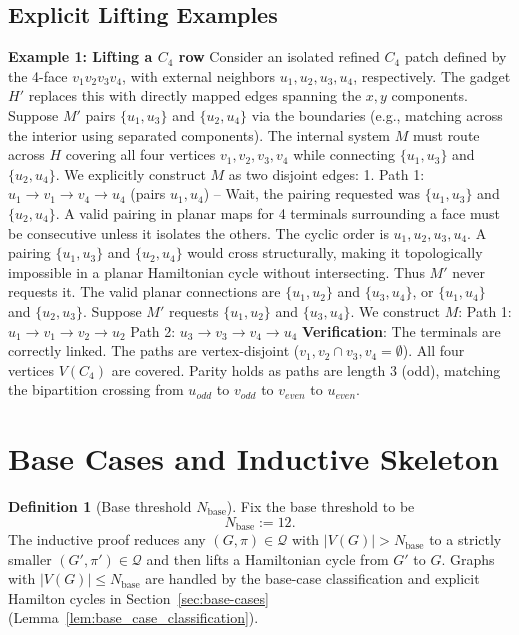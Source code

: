 \documentclass[12pt]{article}
\theoremstyle{definition}
\newtheorem{definition}[theorem]{Definition}
\begin{document}
\subsection{Explicit Lifting Examples}

\textbf{Example 1: Lifting a $C_4$ row}
Consider an isolated refined $C_4$ patch defined by the 4-face $v_1v_2v_3v_4$, with external neighbors $u_1, u_2, u_3, u_4$, respectively. The gadget $H'$ replaces this with directly mapped edges spanning the $x, y$ components.
Suppose $M'$ pairs $\{u_1, u_3\}$ and $\{u_2, u_4\}$ via the boundaries (e.g., matching across the interior using separated components).
The internal system $M$ must route across $H$ covering all four vertices $v_1, v_2, v_3, v_4$ while connecting $\{u_1, u_3\}$ and $\{u_2, u_4\}$. 
We explicitly construct $M$ as two disjoint edges:
1. Path 1: $u_1 \to v_1 \to v_4 \to u_4$ (pairs $u_1, u_4$) -- Wait, the pairing requested was $\{u_1, u_3\}$ and $\{u_2, u_4\}$.
A valid pairing in planar maps for 4 terminals surrounding a face must be consecutive unless it isolates the others. The cyclic order is $u_1, u_2, u_3, u_4$. A pairing $\{u_1, u_3\}$ and $\{u_2, u_4\}$ would cross structurally, making it topologically impossible in a planar Hamiltonian cycle without intersecting. Thus $M'$ never requests it. The valid planar connections are $\{u_1, u_2\}$ and $\{u_3, u_4\}$, or $\{u_1, u_4\}$ and $\{u_2, u_3\}$.
Suppose $M'$ requests $\{u_1, u_2\}$ and $\{u_3, u_4\}$.
We construct $M$: 
Path 1: $u_1 \to v_1 \to v_2 \to u_2$
Path 2: $u_3 \to v_3 \to v_4 \to u_4$
\textbf{Verification}: The terminals are correctly linked. The paths are vertex-disjoint ($v_1,v_2 \cap v_3,v_4 = \emptyset$). All four vertices $V(C_4)$ are covered. Parity holds as paths are length 3 (odd), matching the bipartition crossing from $u_{odd}$ to $v_{odd}$ to $v_{even}$ to $u_{even}$.

\section{Base Cases and Inductive Skeleton}
\label{sec:inductive-skeleton}

\begin{definition}[Base threshold $N_{\mathrm{base}}$]\label{def:Nbase}
Fix the base threshold to be
\[
N_{\mathrm{base}}:=12.
\]
The inductive proof reduces any $(G,\pi)\in\mathcal{Q}$ with $|V(G)|>N_{\mathrm{base}}$ to a strictly smaller $(G',\pi')\in\mathcal{Q}$ and then lifts a Hamiltonian cycle from $G'$ to $G$.
Graphs with $|V(G)|\le N_{\mathrm{base}}$ are handled by the base-case classification and explicit Hamilton cycles in Section~\ref{sec:base-cases} (Lemma~\ref{lem:base_case_classification}).
\end{definition}
\end{document}
